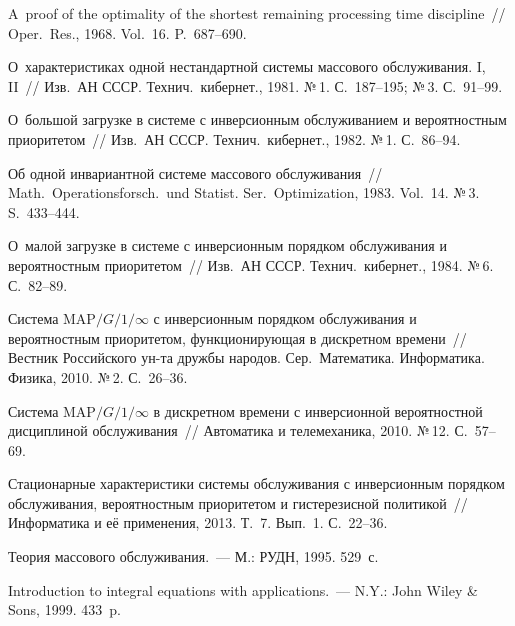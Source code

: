 \begin{multicols}{2}
{\small\frenchspacing
 {%
 \begin{thebibliography}{99}
 A~proof of the
optimality of the shortest remaining processing
time discipline~//
Oper.\ Res., 1968. Vol.~16. P.~687--690.



О~характеристиках одной нестандартной системы
массового обслуживания. I, II~//
Изв.\ АН СССР. Технич.\ кибернет., 1981.
№\,1. С.~187--195; №\,3. С.~91--99.

О~большой загрузке в системе с инверсионным
обслуживанием и вероятностным приоритетом~//
Изв.\ АН СССР. Технич.\ кибернет., 1982. №\,1. С.~86--94.

 Об одной
инвариантной системе массового обслуживания~//
Math.\ Operationsforsch.\ und Statist.
Ser.\ Optimization, 1983. Vol.~14. №\,3. S.~433--444.



О~малой загрузке в системе с инверсионным порядком
обслуживания и вероятностным приоритетом~//
Изв.\ АН СССР. Технич.\ кибернет., 1984. №\,6. С.~82--89.

Система MAP$/G/1/\infty$ с инверсионным порядком
обслуживания и вероятностным приоритетом,
функционирующая в дискретном времени~//
Вестник Российского ун-та дружбы народов.
Сер.\ Математика. Информатика. Физика, 2010.
№\,2. С.~26--36.

Система MAP$/G/1/\infty$ в дискретном
времени с инверсионной вероятностной дисциплиной
обслуживания~//
Автоматика и телемеханика, 2010. №\,12. С.~57--69.

Стационарные характеристики системы обслуживания с
инверсионным порядком обслуживания, вероятностным
приоритетом и гистерезисной политикой~//
Информатика и её применения, 2013. Т.~7. Вып.~1. С.~22--36.

Теория массового обслуживания.~--- М.: РУДН, 1995.
529~с.

Introduction to integral equations with
applications.~--- N.Y.: John Wiley \& Sons, 1999.
433~p.


\end{thebibliography}}}
\end{multicols}
